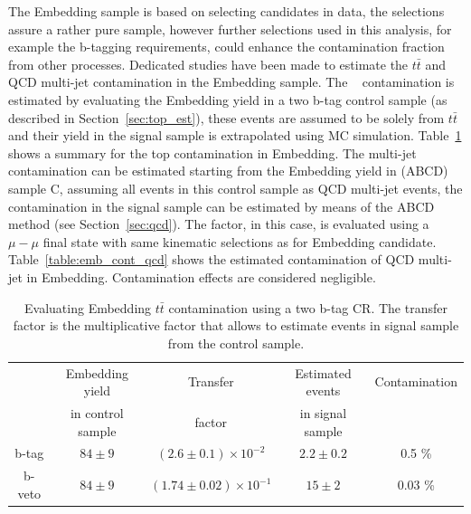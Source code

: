 
The Embedding sample is based on selecting \Zmumu candidates in data, the selections assure a rather 
pure \Zmumu sample, however further selections used in this analysis, for example the b-tagging requirements, 
could enhance the contamination fraction from other processes. Dedicated studies have been
made to estimate the $t\bar{t}$ and QCD multi-jet contamination in the Embedding sample.
The \ttbar~ contamination is estimated by evaluating the Embedding yield in a two b-tag control sample
(as described in Section~\ref{sec:top_est}), these events are assumed to be solely from $t\bar{t}$
and their yield in the signal sample is extrapolated using MC simulation.
Table~\ref{table:emb_cont_tt} shows a summary for the top contamination in Embedding. 
The multi-jet contamination can be estimated starting 
from the Embedding yield in (ABCD) sample C,
assuming all events in this control sample as QCD multi-jet events, the contamination in the signal sample 
can be estimated by means of the ABCD method (see Section~\ref{sec:qcd}). The \rqcd factor, in this case, 
is evaluated using a $\mu-\mu$ final state with same kinematic selections as for Embedding \Zmumu candidate.
Table~\ref{table:emb_cont_qcd}
shows the estimated contamination of QCD multi-jet in Embedding. 
Contamination effects are considered negligible.


\begin{table} [tp]
\begin{small}
\centering
\begin{tabular}{c c c c c}
\hline
\hline
 & Embedding yield	& Transfer	& Estimated events	& Contamination \\
 & in control sample	& factor	& in signal sample	&	\\		 [0.5ex]
\hline
b-tag & $84 \pm 9$  & $(2.6 \pm 0.1) \times 10^{-2}$ &  $2.2 \pm 0.2$&  0.5 \% \\
b-veto & $84 \pm 9$ & $(1.74 \pm 0.02) \times 10^{-1}$ & $15 \pm 2$ & 0.03 \% \\[1ex]
\hline
\end{tabular}
\end{small}
\caption{Evaluating Embedding $t\bar{t}$ contamination using a two b-tag CR. The transfer factor is the
multiplicative factor that allows to estimate events in signal sample from the control sample. }
\label{table:emb_cont_tt}
\end{table}

